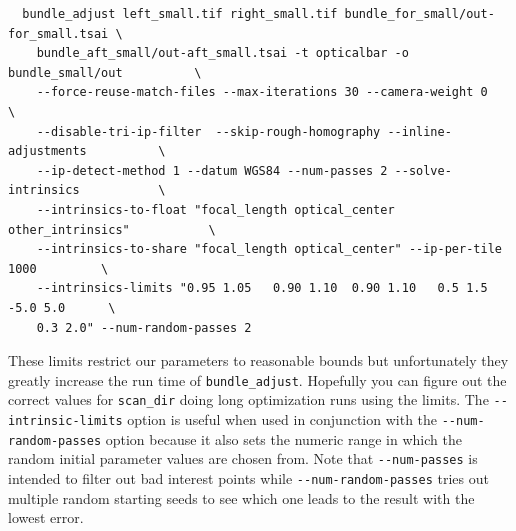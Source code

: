 \begin{verbatim}
  bundle_adjust left_small.tif right_small.tif bundle_for_small/out-for_small.tsai \
    bundle_aft_small/out-aft_small.tsai -t opticalbar -o bundle_small/out          \
    --force-reuse-match-files --max-iterations 30 --camera-weight 0                \
    --disable-tri-ip-filter  --skip-rough-homography --inline-adjustments          \
    --ip-detect-method 1 --datum WGS84 --num-passes 2 --solve-intrinsics           \
    --intrinsics-to-float "focal_length optical_center other_intrinsics"           \
    --intrinsics-to-share "focal_length optical_center" --ip-per-tile 1000         \
    --intrinsics-limits "0.95 1.05   0.90 1.10  0.90 1.10   0.5 1.5  -5.0 5.0      \
    0.3 2.0" --num-random-passes 2
\end{verbatim}

These limits restrict our parameters to reasonable bounds but unfortunately they greatly
increase the run time of \texttt{bundle\_adjust}.  Hopefully you can figure out the correct
values for \texttt{scan\_dir} doing long optimization runs using the limits.  The
\texttt{-\/-intrinsic-limits} option is useful when used in conjunction with the
\texttt{-\/-num-random-passes} option because it also sets the numeric range in which the
random initial parameter values are chosen from.  Note that \texttt{-\/-num-passes} is
intended to filter out bad interest points while \texttt{-\/-num-random-passes} tries out
multiple random starting seeds to see which one leads to the result with the lowest error.
